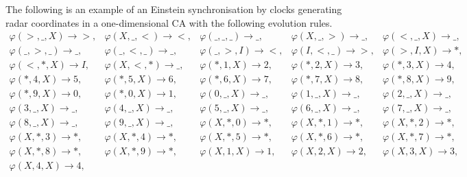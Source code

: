 \documentclass[pre,preprint,showpacs,showkeys,amsfonts]{revtex4}
\begin{document}
The following is an  example \cite{svozil-1996-time} of an
Einstein synchronisation by clocks generating radar coordinates in a
one-dimensional CA with the following evolution rules.
{\scriptsize
\begin{equation}
\begin{array}{lllll}
\varphi ( > ,\_ ,X)  \rightarrow   > ,&
  \varphi (X,\_ , < )  \rightarrow   < ,&
  \varphi (\_ ,\_ ,\_ )  \rightarrow  \_ ,&
  \varphi (X,\_ , > )  \rightarrow  \_ ,&
  \varphi ( < ,\_ ,X)  \rightarrow  \_ ,\\
  \varphi (\_ , > ,\_ )  \rightarrow  \_ ,&
  \varphi (\_ , < ,\_ )  \rightarrow  \_ ,&
  \varphi (\_ , > ,I)  \rightarrow   < ,&
  \varphi (I, < ,\_ )  \rightarrow   > ,&
  \varphi ( > ,I,X)  \rightarrow   * ,\\
  \varphi ( < , * ,X)  \rightarrow  I,&
  \varphi (X, < , * )  \rightarrow  \_ ,&
  \varphi ( * , 1 ,X)  \rightarrow   2 ,&
  \varphi ( * , 2 ,X)  \rightarrow   3 ,&
  \varphi ( * , 3 ,X)  \rightarrow   4 ,\\
  \varphi ( * , 4 ,X)  \rightarrow   5 ,&
  \varphi ( * , 5 ,X)  \rightarrow   6 ,&
  \varphi ( * , 6 ,X)  \rightarrow   7 ,&
  \varphi ( * , 7 ,X)  \rightarrow   8 ,&
  \varphi ( * , 8 ,X)  \rightarrow   9 ,\\
  \varphi ( * , 9 ,X)  \rightarrow   0 ,&
  \varphi ( * , 0 ,X)  \rightarrow   1 ,&
  \varphi ( 0 ,\_ ,X)  \rightarrow  \_ ,&
  \varphi ( 1 ,\_ ,X)  \rightarrow  \_ ,&
  \varphi ( 2 ,\_ ,X)  \rightarrow  \_ ,\\
  \varphi ( 3 ,\_ ,X)  \rightarrow  \_ ,&
  \varphi ( 4 ,\_ ,X)  \rightarrow  \_ ,&
  \varphi ( 5 ,\_ ,X)  \rightarrow  \_ ,&
  \varphi ( 6 ,\_ ,X)  \rightarrow  \_ ,&
  \varphi ( 7 ,\_ ,X)  \rightarrow  \_ ,\\
  \varphi ( 8 ,\_ ,X)  \rightarrow  \_ ,&
  \varphi ( 9 ,\_ ,X)  \rightarrow  \_ ,&
  \varphi (X, * , 0 )  \rightarrow   * ,&
  \varphi (X, * , 1 )  \rightarrow   * ,&
  \varphi (X, * , 2 )  \rightarrow   * ,\\
  \varphi (X, * , 3 )  \rightarrow   * ,&
  \varphi (X, * , 4 )  \rightarrow   * ,&
  \varphi (X, * , 5 )  \rightarrow   * ,&
  \varphi (X, * , 6 )  \rightarrow   * ,&
  \varphi (X, * , 7 )  \rightarrow   * ,\\
  \varphi (X, * , 8 )  \rightarrow   * ,&
  \varphi (X, * , 9 )  \rightarrow   * ,&
  \varphi (X, 1 ,X)  \rightarrow   1 ,&
  \varphi (X, 2 ,X)  \rightarrow   2 ,&
  \varphi (X, 3 ,X)  \rightarrow   3 ,\\
  \varphi (X, 4 ,X)  \rightarrow   4 ,&

\end{array}
\end{equation}}
\end{document}
